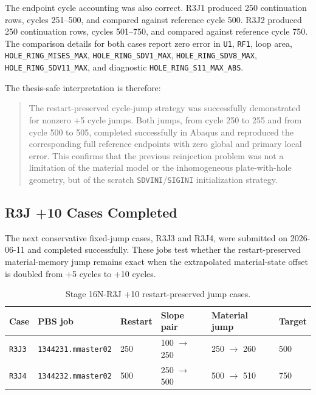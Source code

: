 \documentclass[11pt,a4paper]{article}
\newcommand{\code}[1]{\texttt{#1}}
\begin{document}
The endpoint cycle accounting was also correct. R3J1 produced 250 continuation rows, cycles 251--500, and compared against reference cycle 500. R3J2 produced 250 continuation rows, cycles 501--750, and compared against reference cycle 750. The comparison details for both cases report zero error in \code{U1}, \code{RF1}, loop area, \code{HOLE\_RING\_MISES\_MAX}, \code{HOLE\_RING\_SDV1\_MAX}, \code{HOLE\_RING\_SDV8\_MAX}, \code{HOLE\_RING\_SDV11\_MAX}, and diagnostic \code{HOLE\_RING\_S11\_MAX\_ABS}.

The thesis-safe interpretation is therefore:

\begin{quote}
The restart-preserved cycle-jump strategy was successfully demonstrated for nonzero +5 cycle jumps. Both jumps, from cycle 250 to 255 and from cycle 500 to 505, completed successfully in Abaqus and reproduced the corresponding full reference endpoints with zero global and primary local error. This confirms that the previous reinjection problem was not a limitation of the material model or the inhomogeneous plate-with-hole geometry, but of the scratch \code{SDVINI}/\code{SIGINI} initialization strategy.
\end{quote}

\subsection{R3J +10 Cases Completed}

The next conservative fixed-jump cases, R3J3 and R3J4, were submitted on 2026-06-11 and completed successfully. These jobs test whether the restart-preserved material-memory jump remains exact when the extrapolated material-state offset is doubled from +5 cycles to +10 cycles.

\begin{table}[H]
\centering
\caption{Stage 16N-R3J +10 restart-preserved jump cases.}
\begin{tabular}{llllll}
\toprule
Case & PBS job & Restart & Slope pair & Material jump & Target \\
\midrule
\code{R3J3} & \code{1344231.mmaster02} & 250 & 100 $\rightarrow$ 250 & 250 $\rightarrow$ 260 & 500 \\
\code{R3J4} & \code{1344232.mmaster02} & 500 & 250 $\rightarrow$ 500 & 500 $\rightarrow$ 510 & 750 \\
\bottomrule
\end{tabular}
\end{table}
\end{document}
